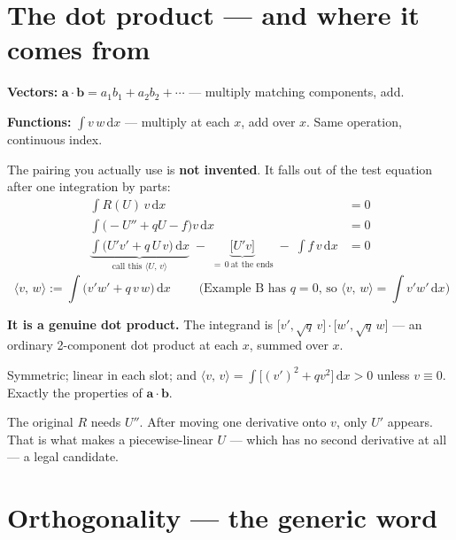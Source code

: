 \documentclass[11pt]{article}
\newcommand{\dx}{\,\mathrm{d}x}
\newcommand{\ip}[2]{\bigl\langle #1,\,#2\bigr\rangle}
\begin{document}
\section{The dot product --- and where it comes from}

\begin{pts}
\item \textbf{Vectors:} $\bm{a}\cdot\bm{b}=a_1b_1+a_2b_2+\cdots$ --- multiply
      matching components, add.
\item \textbf{Functions:} $\int v\,w\dx$ --- multiply at each $x$, add over $x$.
      Same operation, continuous index.
\end{pts}

The pairing you actually use is \textbf{not invented}. It falls out of the test
equation after one integration by parts:
\begin{align*}
  \int R(U)\,v\dx &= 0\\
  \int\bigl(-U''+qU-f\bigr)v\dx &= 0\\
  \underbrace{\int\bigl(U'v'+q\,U\,v\bigr)\dx}_{\textstyle\text{call this }\ip{U}{v}}
    \;-\;\underbrace{\bigl[U'v\bigr]}_{=\,0\ \text{at the ends}}
    \;-\;\int f\,v\dx &= 0
\end{align*}
\[
  \boxed{\;\ip{v}{w}:=\int\bigl(v'w'+q\,v\,w\bigr)\dx\;}
  \qquad\text{(Example B has $q=0$, so $\ip{v}{w}=\int v'w'\dx$)}
\]

\begin{pts}
\item \textbf{It is a genuine dot product.} The integrand is
      $\bigl[v',\sqrt{q}\,v\bigr]\cdot\bigl[w',\sqrt{q}\,w\bigr]$ --- an
      ordinary 2-component dot product at each $x$, summed over $x$.
\item Symmetric; linear in each slot; and
      $\ip{v}{v}=\int\bigl[(v')^2+qv^2\bigr]\dx>0$ unless $v\equiv0$. Exactly
      the properties of $\bm{a}\cdot\bm{b}$.
\end{pts}

\begin{intuition}
The original $R$ needs $U''$. After moving one derivative onto $v$, only $U'$
appears. That is what makes a piecewise-linear $U$ --- which has no second
derivative at all --- a legal candidate.
\end{intuition}

\section{Orthogonality --- the generic word}
\end{document}
